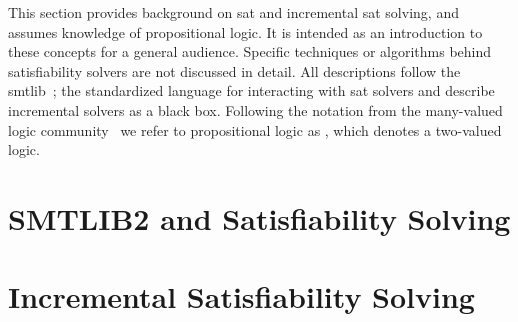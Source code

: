 \label{chapter:background}
%
This section provides background on \ac{sat} and incremental \ac{sat} solving,
and assumes knowledge of propositional logic. It is intended as an introduction
to these concepts for a general audience. Specific techniques or algorithms
behind satisfiability solvers are not discussed in detail. All descriptions
follow the \acl{smtlib}~\cite{BarFT-SMTLIB}; the standardized language for
interacting with \ac{sat} solvers and describe incremental solvers as a black
box. Following the notation from the many-valued logic
community~\cite{Rescher1969-RESML} we refer to propositional logic as \pl{},
which denotes a two-valued logic.
%
\section{SMTLIB2 and Satisfiability Solving}

%
\section{Incremental Satisfiability Solving}


